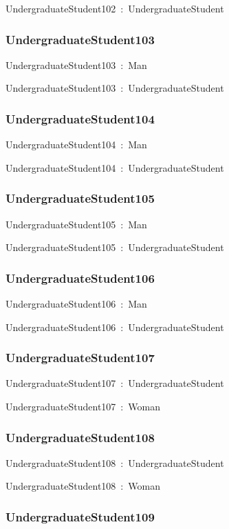 \documentclass{article}
\begin{document}
UndergraduateStudent102~:~UndergraduateStudent

\subsubsection*{UndergraduateStudent103}

UndergraduateStudent103~:~Man

UndergraduateStudent103~:~UndergraduateStudent

\subsubsection*{UndergraduateStudent104}

UndergraduateStudent104~:~Man

UndergraduateStudent104~:~UndergraduateStudent

\subsubsection*{UndergraduateStudent105}

UndergraduateStudent105~:~Man

UndergraduateStudent105~:~UndergraduateStudent

\subsubsection*{UndergraduateStudent106}

UndergraduateStudent106~:~Man

UndergraduateStudent106~:~UndergraduateStudent

\subsubsection*{UndergraduateStudent107}

UndergraduateStudent107~:~UndergraduateStudent

UndergraduateStudent107~:~Woman

\subsubsection*{UndergraduateStudent108}

UndergraduateStudent108~:~UndergraduateStudent

UndergraduateStudent108~:~Woman

\subsubsection*{UndergraduateStudent109}
\end{document}
